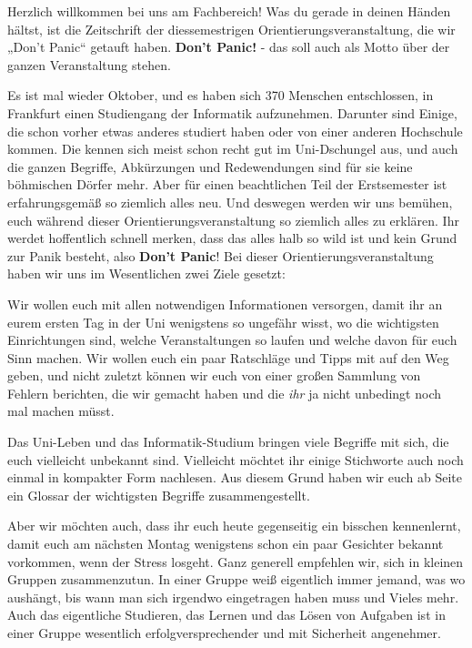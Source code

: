 Herzlich willkommen bei uns am Fachbereich! Was du gerade in deinen Händen
hältst, ist die Zeitschrift der diessemestrigen Orientierungsveranstaltung, die
wir „Don’t Panic“ getauft haben. \textbf{Don’t Panic!} - das soll auch als
Motto über der ganzen Veranstaltung stehen.


Es ist mal wieder Oktober, und es haben sich 370 Menschen entschlossen,
in Frankfurt einen Studiengang der Informatik aufzunehmen. Darunter sind
Einige, die schon vorher etwas anderes studiert haben oder von einer anderen
Hochschule kommen. Die kennen sich meist schon recht gut im Uni-Dschungel aus,
und auch die ganzen Begriffe, Abkürzungen und Redewendungen sind für sie keine
böhmischen Dörfer mehr. Aber für einen beachtlichen Teil der Erstsemester ist
erfahrungsgemäß so ziemlich alles neu. Und deswegen werden wir uns bemühen,
euch während dieser Orientierungsveranstaltung so ziemlich alles zu erklären.
Ihr werdet hoffentlich schnell merken, dass das alles halb so wild ist und kein
Grund zur Panik besteht, also \textbf{Don’t Panic}! Bei dieser
Orientierungsveranstaltung haben wir uns im Wesentlichen zwei Ziele gesetzt:


Wir wollen euch mit allen notwendigen Informationen versorgen, damit ihr an
eurem ersten Tag in der Uni wenigstens so ungefähr wisst, wo die wichtigsten
Einrichtungen sind, welche Veranstaltungen so laufen und welche davon für euch
Sinn machen. Wir wollen euch ein paar Ratschläge und Tipps mit auf den Weg
geben, und nicht zuletzt können wir euch von einer großen Sammlung von Fehlern
berichten, die wir gemacht haben und die \textsl{ihr} ja nicht unbedingt noch
mal machen müsst.


Das Uni-Leben und das Informatik-Studium bringen viele Begriffe mit sich, die
euch vielleicht unbekannt sind. Vielleicht möchtet ihr einige Stichworte auch
noch einmal in kompakter Form nachlesen. Aus diesem Grund haben wir euch ab
Seite \pageref{glossar} ein Glossar der wichtigsten Begriffe zusammengestellt.


Aber wir möchten auch, dass ihr euch heute gegenseitig ein
bisschen kennenlernt, damit euch am nächsten Montag wenigstens schon ein paar
Gesichter bekannt vorkommen, wenn der Stress losgeht. Ganz generell empfehlen
wir, sich in kleinen Gruppen zusammenzutun. In einer Gruppe weiß eigentlich
immer jemand, was wo aushängt, bis wann man sich irgendwo eingetragen haben
muss und Vieles mehr. Auch das eigentliche Studieren, das Lernen und das Lösen
von Aufgaben ist in einer Gruppe wesentlich erfolgversprechender und mit
Sicherheit angenehmer.
